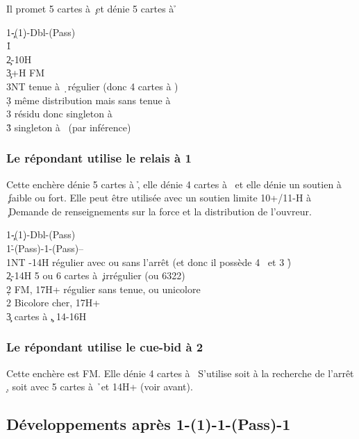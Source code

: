 \documentclass[a4paper]{article}
\begin{document}
Il promet 5 cartes à \c\ et dénie 5 cartes à \h 

\begin{bidtable}
1\c-(1\d)-Dbl-(Pass)\\
1\h\+\\
2\c {}-10H\\
3\c {}+H FM\+\\
3NT \> tenue à \d\ régulier (donc 4 cartes à \s )\\
3\d \> même distribution mais sans tenue à \d \\
3\s \> résidu donc singleton à \d \\
3\h \> singleton à \s\ (par inférence)\-\-
\end{bidtable}

\subsubsection{Le répondant utilise le relais à 1 \pdfs}

Cette enchère dénie 5 cartes à \h , elle dénie 4 cartes à \s\ et elle dénie un soutien à \c\ faible ou fort.
Elle peut être utilisée avec un soutien limite 10+/11-H à \c\ 
Demande de renseignements sur la force et la distribution de l’ouvreur.

\begin{bidtable}
1\c-(1\d)-Dbl-(Pass)\\
1\h-(Pass)-1\s-(Pass)--\\
1NT -14H régulier avec ou sans l’arrêt (et donc il possède 4 \s\ et 3 \h )\\
2\c \> 12-14H 5 ou 6 cartes à \c\ irrégulier (ou 6322)\\
2\d \> FM, 17H+ régulier sans tenue, ou unicolore \c \\
2\s \> Bicolore cher, 17H+\\
3\c {} cartes à \c , 14-16H
\end{bidtable}

\subsubsection{Le répondant utilise le cue-bid à 2 \pdfd}

Cette enchère est FM. Elle dénie 4 cartes à \s\ 
S’utilise soit à la recherche de l’arrêt \d , soit avec 5 cartes à \h\ et 14H+ (voir avant).

\subsection{Développements après 1\pdfc-(1\pdfd)-1\pdfh-(Pass)-1\pdfs}
\end{document}
